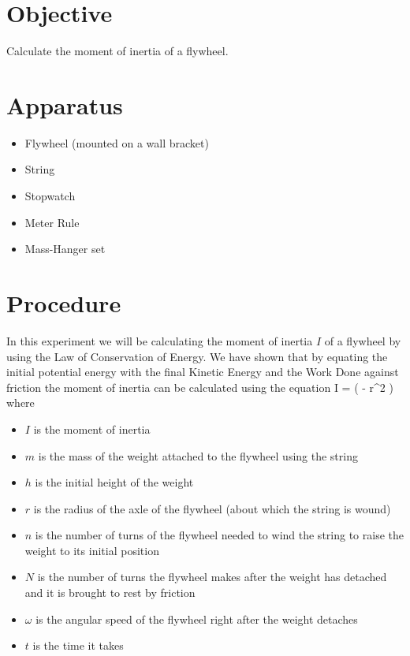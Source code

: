 \section{Objective}

    Calculate the moment of inertia of a flywheel.

\section{Apparatus}

    \begin{itemize}

        \item Flywheel (mounted on a wall bracket)
        \item String
        \item Stopwatch
        \item Meter Rule
        \item Mass-Hanger set

    \end{itemize}

\section{Procedure}

    In this experiment we will be calculating the moment of inertia $I$ of a flywheel by using the Law of Conservation of Energy. We have shown that by equating the initial potential energy with the final Kinetic Energy and the Work Done against friction the moment of inertia can be calculated using the equation
    \beq \label{I}
        I =  \left(  - r^2 \right)
    \eeq
    where
    \begin{itemize}

        \item $I$ is the moment of inertia
        \item $m$ is the mass of the weight attached to the flywheel using the string
        \item $h$ is the initial height of the weight
        \item $r$ is the radius of the axle of the flywheel (about which the string is wound)
        \item $n$ is the number of turns of the flywheel needed to wind the string to raise the weight to its initial position
        \item $N$ is the number of turns the flywheel makes after the weight has detached and it is brought to rest by friction
        \item $\omega$ is the angular speed of the flywheel right after the weight detaches
        \item $t$ is the time it takes

    \end{itemize}

